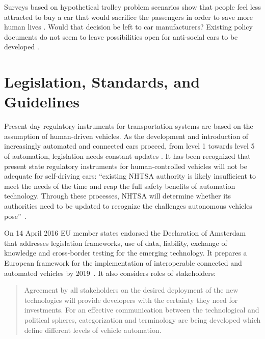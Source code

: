 Surveys based on hypothetical trolley problem scenarios show that people feel less attracted to buy a car that would sacrifice the passengers in order to save more human lives \cite{Bonnefon2016}. Would that decision be left to car manufacturers? Existing policy documents do not seem to leave possibilities open for anti-social cars to be developed \cite{EthicsCommission2017pr,EthicsCommission2017b,Pillath2016,NHTSA2016PolicyUpdate,DBLP:journals/corr/CharisiDFLMSSWY17} .


\section{Legislation, Standards, and Guidelines}
\label{sec:LegislationStandardGuidelines}

Present-day regulatory instruments for transportation systems are based on the assumption of human-driven vehicles. As the development and introduction of increasingly automated and connected cars proceed, from level 1 towards level 5 of automation, legislation needs constant updates \cite{EthicsCommission2017pr,EthicsCommission2017b,Pillath2016,NHTSA2016PolicyUpdate}. It has been recognized that present state regulatory instruments for human-controlled vehicles will not be adequate for self-driving cars:  \enquote{existing NHTSA authority is likely insufficient to meet the needs of the time and reap the full safety benefits of automation technology. Through these processes, NHTSA will determine whether its authorities need to be updated to recognize the challenges autonomous vehicles pose}~\cite{NHTSA2016PolicyUpdate}. %

On 14 April 2016 EU member states endorsed the Declaration of Amsterdam \cite{GovernmentNL2017} that addresses legislation frameworks, use of data, liability, exchange of knowledge and cross-border testing for the emerging technology. It prepares a European framework for the implementation of interoperable connected and automated vehicles by 2019~\cite{EthicsCommission2017b}. It also considers roles of stakeholders:

 \begin{quote}
 Agreement by all stakeholders on the desired deployment of the new technologies will provide developers with the certainty they need for investments. For an effective communication between the technological and political spheres, categorization and terminology are being developed which define different levels of vehicle automation. \cite{Pillath2016} %
 \end{quote} %
 
